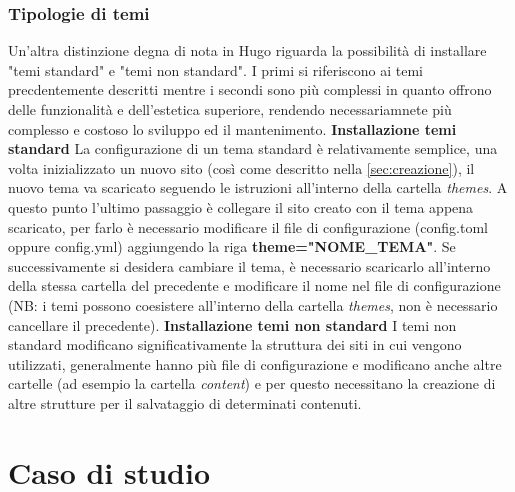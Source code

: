 \documentclass[target=bach,aauheader=]{thud}
\begin{document}
\subsection{Tipologie di temi}
Un'altra distinzione degna di nota in Hugo riguarda la possibilità di installare "temi standard" e "temi non standard". I primi si riferiscono ai temi precdentemente descritti mentre i secondi sono più complessi in quanto offrono delle funzionalità e dell'estetica superiore, rendendo necessariamnete più complesso e costoso lo sviluppo ed il mantenimento.
\newline \newline
\textbf{{\fontsize{12}{14}\selectfont Installazione temi standard}}
\newline \newline
La configurazione di un tema standard è relativamente semplice, una volta inizializzato un nuovo sito (così come descritto nella \cref{sec:creazione}), il nuovo tema va scaricato seguendo le istruzioni all'interno della cartella \textit{themes}. 
A questo punto l'ultimo passaggio è collegare il sito creato con il tema appena scaricato, per farlo è necessario modificare il file di configurazione (config.toml oppure config.yml) aggiungendo la riga \textbf{theme="NOME\_TEMA"}.
\newline
Se successivamente si desidera cambiare il tema, è necessario scaricarlo all'interno della stessa cartella del precedente e modificare il nome nel file di configurazione (NB: i temi possono coesistere all'interno della cartella \textit{themes}, non è necessario cancellare il precedente).
\newline \newline
\textbf{{\fontsize{12}{14}\selectfont Installazione temi non standard}}
\newline \newline
I temi non standard modificano significativamente la struttura dei siti in cui vengono utilizzati, generalmente hanno più file di configurazione e modificano anche altre cartelle (ad esempio la cartella \textit{content}) e per questo necessitano la creazione di altre strutture per il salvataggio di determinati contenuti.


\chapter{Caso di studio}\label{cap:casostudio}
\end{document}
